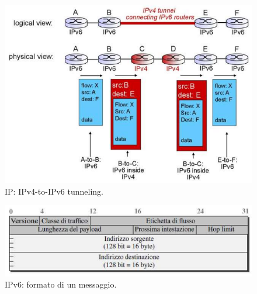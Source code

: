 \documentclass[11pt, italian, openany]{book}
\begin{document}
\begin{sloppypar}
\begin{figure}[!h]
	\centering
	\includegraphics[scale=0.4]{images/ip-tunneling.png}
	\caption{IP: IPv4-to-IPv6 tunneling.}
	\label{fig:ip-tunneling}
\end{figure}

\pagebreak

\begin{figure}[!h]
	\centering
	\includegraphics[scale=0.5]{images/ipv6-messaggio.png}
	\caption{IPv6: formato di un messaggio.}
	\label{fig:ipv6-messaggio}
\end{figure}


\end{sloppypar}
\end{document}
